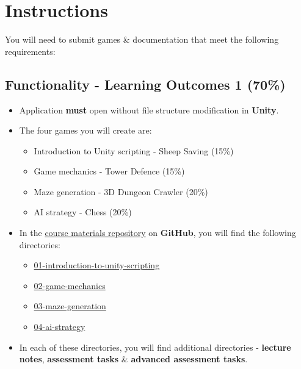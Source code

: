 \documentclass{article}
\begin{document}
\section*{Instructions}
You will need to submit games \& documentation that meet the following requirements:

\subsection*{Functionality - Learning Outcomes 1 (70\%)}
\begin{itemize}
	\item Application \textbf{must} open without file structure modification in \textbf{Unity}.
	\item The four games you will create are:
	\begin{itemize}
		\item Introduction to Unity scripting - Sheep Saving (15\%)
		\item Game mechanics - Tower Defence (15\%)
		\item Maze generation - 3D Dungeon Crawler (20\%)
		\item AI strategy - Chess (20\%)
	\end{itemize}
	\item In the \href{https://github.com/otago-polytechnic-bit-courses/ID630151-introduction-to-algorithmic-problem-solving}{course materials repository} on \textbf{GitHub}, you will find the following directories:
	\begin{itemize}
		\item \href{https://github.com/otago-polytechnic-bit-courses/ID630151-introduction-to-algorithmic-problem-solving/tree/main/01-introduction-to-unity-scripting}{01-introduction-to-unity-scripting}
		\item \href{https://github.com/otago-polytechnic-bit-courses/ID630151-introduction-to-algorithmic-problem-solving/tree/main/02-game-mechanics}{02-game-mechanics}
		\item \href{https://github.com/otago-polytechnic-bit-courses/ID630151-introduction-to-algorithmic-problem-solving/tree/main/03-maze-generation}{03-maze-generation}
		\item \href{https://github.com/otago-polytechnic-bit-courses/ID630151-introduction-to-algorithmic-problem-solving/tree/main/04-ai-strategy}{04-ai-strategy}
	\end{itemize}
	\item In each of these directories, you will find additional directories - \textbf{lecture notes}, \textbf{assessment tasks} \& \textbf{advanced assessment tasks}. 

\end{itemize}
\end{document}
